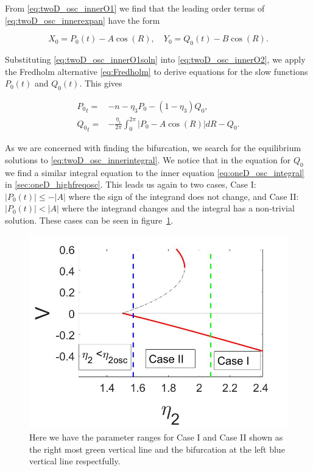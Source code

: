 From \eqref{eq:twoD_osc_innerO1} we find that the leading order terms of \eqref{eq:twoD_osc_innerexpan} have the form 

\begin{equation}\label{eq:twoD_osc_innerO1soln}
X_0=P_0(t)-A\cos(R),\quad Y_0=Q_0(t)-B\cos(R).
\end{equation}
 
Substituting \eqref{eq:twoD_osc_innerO1soln} into \eqref{eq:twoD_osc_innerO2}, we apply the Fredholm alternative \eqref{eq:Fredholm} to derive equations for the slow functions $P_0(t)$ and $Q_0(t)$. This gives

\begin{equation}\label{eq:twoD_osc_innerintegral}
\begin{aligned}
{P_0}_t =& -n -\eta_3P_0-(1-\eta_3)Q_0,\\
{Q_0}_t =& -\frac{\eta_1}{2\pi}\int_0^{2\pi}|P_0-A\cos(R)|dR-Q_0.
\end{aligned}
\end{equation}

As we are concerned with finding the bifurcation, we search for the equilibrium solutions to \eqref{eq:twoD_osc_innerintegral}. We notice that in the equation for $Q_0$ we find a similar integral equation to the inner equation \eqref{eq:oneD_osc_integral} in \autoref{sec:oneD_highfreqosc}. This leads us again to two cases, Case I: $|P_0(t)|\le -|A|$ where the sign of the integrand does not change, and Case II: $|P_0(t)|<|A|$ where the integrand changes and the integral has a non-trivial solution. These cases can be seen in figure~\ref{fig:twoD_osc_cases}.

\begin{figure}[H]
\centering
\includegraphics[scale=.25]{twoD/osc_cases.jpg}
\caption{Here we have the parameter ranges for Case I and Case II shown as the right most green vertical line and the bifurcation at the left blue vertical line respectfully.}
\label{fig:twoD_osc_cases}
\end{figure}

